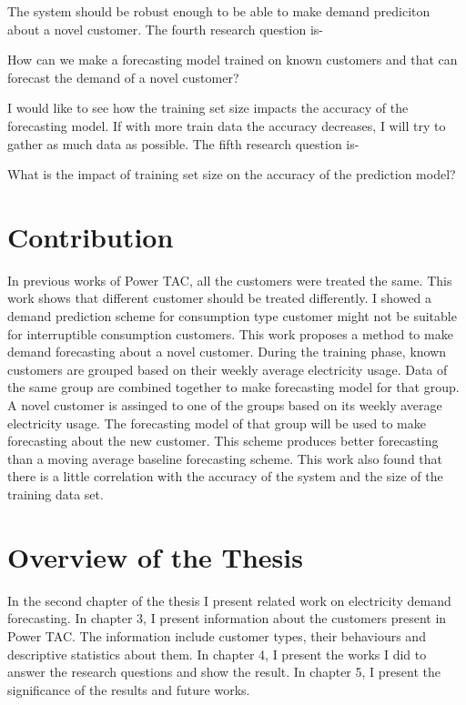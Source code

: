 The system should be robust enough to be able to make demand prediciton about a novel customer. The fourth research question is-
\begin{displayquote}
How can we make a forecasting model trained on known customers and that can forecast the demand of a novel customer?
\end{displayquote}

I would like to see how the training set size impacts the accuracy of the forecasting model. If with more train data the accuracy decreases, I will try to gather as much data as possible. The fifth research question is-
\begin{displayquote}
What is the impact of training set size on the accuracy of the prediction model?
\end{displayquote}
 
\section{Contribution}
In previous works of Power TAC, all the customers were treated the same. This work shows that different customer should be treated differently. I showed a demand prediction scheme for consumption type customer might not be suitable for interruptible consumption customers. This work proposes a method to make demand forecasting about a novel customer. During the training phase, known customers are grouped based on their weekly average electricity usage. Data of the same group are combined together to make forecasting model for that group. A novel customer is assinged to one of the groups based on its weekly average electricity usage. The forecasting model of that group will be used to make forecasting about the new customer. This scheme produces better forecasting than a moving average baseline forecasting scheme. This work also found that there is a little correlation with the accuracy of the system and the size of the training data set. 

\section{Overview of the Thesis}
In the second chapter of the thesis I present related work on electricity demand forecasting. In chapter 3, I present information about the customers present in Power TAC. The information include customer types, their behaviours and descriptive statistics about them. In chapter 4, I present the works I did to answer the research questions and show the result. In chapter 5, I present the significance of the results and future works.


